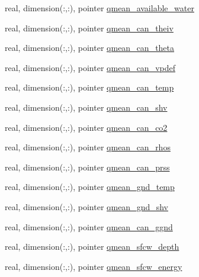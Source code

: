 \begin{DoxyCompactItemize}
real, dimension(\+:,\+:), pointer \hyperlink{structed__state__vars_1_1edtype_a0febf3baad61a0af362eaea95bfd2f3a}{qmean\+\_\+available\+\_\+water}
\item 
real, dimension(\+:,\+:), pointer \hyperlink{structed__state__vars_1_1edtype_ad9013c44c39aeacefb0b27bada9ce6ef}{qmean\+\_\+can\+\_\+theiv}
\item 
real, dimension(\+:,\+:), pointer \hyperlink{structed__state__vars_1_1edtype_a03e23490c3a68c013fbeee30ff4c6822}{qmean\+\_\+can\+\_\+theta}
\item 
real, dimension(\+:,\+:), pointer \hyperlink{structed__state__vars_1_1edtype_a7da946eb539494c5eb08bb60b905201f}{qmean\+\_\+can\+\_\+vpdef}
\item 
real, dimension(\+:,\+:), pointer \hyperlink{structed__state__vars_1_1edtype_a317a35c1e5b57349c4bb9dc0c924f255}{qmean\+\_\+can\+\_\+temp}
\item 
real, dimension(\+:,\+:), pointer \hyperlink{structed__state__vars_1_1edtype_a590dd9e90f15298bcf829d5bd24c992d}{qmean\+\_\+can\+\_\+shv}
\item 
real, dimension(\+:,\+:), pointer \hyperlink{structed__state__vars_1_1edtype_a7a2af138a7592e34f0c88333276a47e0}{qmean\+\_\+can\+\_\+co2}
\item 
real, dimension(\+:,\+:), pointer \hyperlink{structed__state__vars_1_1edtype_a03a64aab0b7b14bab1baaa0f174617e7}{qmean\+\_\+can\+\_\+rhos}
\item 
real, dimension(\+:,\+:), pointer \hyperlink{structed__state__vars_1_1edtype_a2b22a6794bf622499dfabb6a546fc63c}{qmean\+\_\+can\+\_\+prss}
\item 
real, dimension(\+:,\+:), pointer \hyperlink{structed__state__vars_1_1edtype_a00ea11b34e3a60310f98fc80b488d5a4}{qmean\+\_\+gnd\+\_\+temp}
\item 
real, dimension(\+:,\+:), pointer \hyperlink{structed__state__vars_1_1edtype_a91d94bc52a2a3103ced36458fae28215}{qmean\+\_\+gnd\+\_\+shv}
\item 
real, dimension(\+:,\+:), pointer \hyperlink{structed__state__vars_1_1edtype_a5d829fe82a6a627a13f6c2ba01ca6c90}{qmean\+\_\+can\+\_\+ggnd}
\item 
real, dimension(\+:,\+:), pointer \hyperlink{structed__state__vars_1_1edtype_a610e91359bed611a9137ba94b5825c1e}{qmean\+\_\+sfcw\+\_\+depth}
\item 
real, dimension(\+:,\+:), pointer \hyperlink{structed__state__vars_1_1edtype_a5cbf448f7cda88ccc89719a9d075095e}{qmean\+\_\+sfcw\+\_\+energy}
\item 

\end{DoxyCompactItemize}
